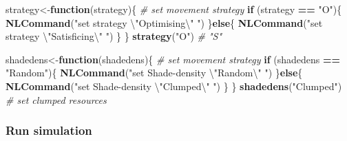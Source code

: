 \documentclass[]{article}
\newenvironment{Shaded}{\begin{snugshade}}{\end{snugshade}}
\newcommand{\KeywordTok}[1]{\textcolor[rgb]{0.13,0.29,0.53}{\textbf{#1}}}
\newcommand{\CharTok}[1]{\textcolor[rgb]{0.31,0.60,0.02}{#1}}
\newcommand{\StringTok}[1]{\textcolor[rgb]{0.31,0.60,0.02}{#1}}
\newcommand{\CommentTok}[1]{\textcolor[rgb]{0.56,0.35,0.01}{\textit{#1}}}
\newcommand{\ControlFlowTok}[1]{\textcolor[rgb]{0.13,0.29,0.53}{\textbf{#1}}}
\newcommand{\OperatorTok}[1]{\textcolor[rgb]{0.81,0.36,0.00}{\textbf{#1}}}
\newcommand{\NormalTok}[1]{#1}
\begin{document}
\begin{Shaded}
\begin{Highlighting}[]
\NormalTok{strategy<-}\ControlFlowTok{function}\NormalTok{(strategy)\{ }\CommentTok{# set movement strategy }
  \ControlFlowTok{if}\NormalTok{ (strategy }\OperatorTok{==}\StringTok{ "O"}\NormalTok{)\{}
    \KeywordTok{NLCommand}\NormalTok{(}\StringTok{"set strategy }\CharTok{\textbackslash{}"}\StringTok{Optimising}\CharTok{\textbackslash{}"}\StringTok{ "}\NormalTok{) }
\NormalTok{    \}}\ControlFlowTok{else}\NormalTok{\{}
    \KeywordTok{NLCommand}\NormalTok{(}\StringTok{"set strategy }\CharTok{\textbackslash{}"}\StringTok{Satisficing}\CharTok{\textbackslash{}"}\StringTok{ "}\NormalTok{) }
\NormalTok{    \}}
\NormalTok{  \}}
\KeywordTok{strategy}\NormalTok{(}\StringTok{"O"}\NormalTok{) }\CommentTok{# "S"}

\NormalTok{shadedens<-}\ControlFlowTok{function}\NormalTok{(shadedens)\{ }\CommentTok{# set movement strategy }
  \ControlFlowTok{if}\NormalTok{ (shadedens }\OperatorTok{==}\StringTok{ "Random"}\NormalTok{)\{}
    \KeywordTok{NLCommand}\NormalTok{(}\StringTok{"set Shade-density }\CharTok{\textbackslash{}"}\StringTok{Random}\CharTok{\textbackslash{}"}\StringTok{ "}\NormalTok{) }
\NormalTok{    \}}\ControlFlowTok{else}\NormalTok{\{}
    \KeywordTok{NLCommand}\NormalTok{(}\StringTok{"set Shade-density }\CharTok{\textbackslash{}"}\StringTok{Clumped}\CharTok{\textbackslash{}"}\StringTok{ "}\NormalTok{) }
\NormalTok{    \}}
\NormalTok{  \}}
\KeywordTok{shadedens}\NormalTok{(}\StringTok{"Clumped"}\NormalTok{) }\CommentTok{# set clumped resources}
\end{Highlighting}
\end{Shaded}

\subsubsection{Run simulation}\label{run-simulation}
\end{document}
